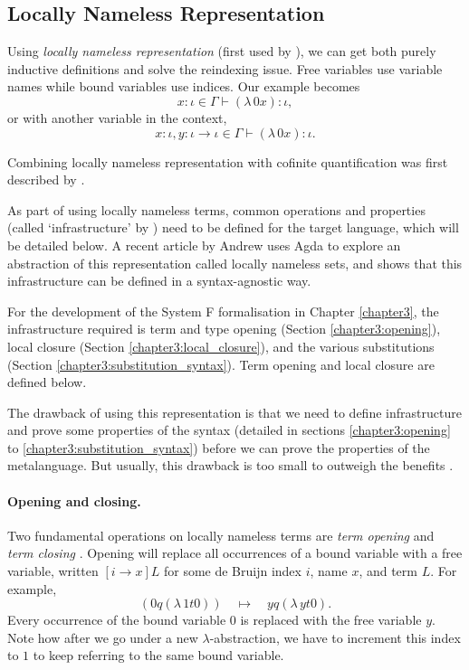 \subsection{Locally Nameless Representation}
\label{section:background_locally_nameless}
Using \textit{locally nameless representation} (first used by \citet{goos_mechanisation_1994}), we
can get both purely inductive definitions and solve the reindexing issue. Free variables use
variable names while bound variables use indices. Our example becomes
\begin{equation*}
  x \colon \iota \in \Gamma \vdash (\lambda \, 0 x) \colon \iota,
\end{equation*}
or with another variable in the context,
\begin{equation*}
  x \colon \iota, y \colon \iota \to \iota \in \Gamma \vdash (\lambda \, 0 x) \colon \iota.
\end{equation*}

Combining locally nameless representation with cofinite quantification was first described by
\citet{aydemir_engineering_2008}.

As part of using locally nameless terms, common operations and properties (called `infrastructure'
by \citet{aydemir_engineering_2008}) need to be defined for the target language, which will be
detailed below. A recent article by Andrew \citet{pitts_locally_2023} uses Agda to explore an
abstraction of this representation called locally nameless sets, and shows that this infrastructure
can be defined in a syntax-agnostic way.

For the development of the System F formalisation in Chapter \ref{chapter3}, the infrastructure
required is term and type opening (Section \ref{chapter3:opening}), local closure (Section
\ref{chapter3:local_closure}), and the various substitutions (Section
\ref{chapter3:substitution_syntax}). Term opening and local closure are defined below.

The drawback of using this representation is that we need to define infrastructure and prove some
properties of the syntax (detailed in sections \ref{chapter3:opening} to
\ref{chapter3:substitution_syntax}) before we can prove the properties of the metalanguage. But
usually, this drawback is too small to outweigh the benefits \citep{aydemir_engineering_2008}.

\paragraph*{Opening and closing.} Two fundamental operations on locally nameless terms are
\textit{term opening} and \textit{term closing} \citep{pitts_locally_2023}. Opening will replace all
occurrences of a bound variable with a free variable, written $[i \to x] L$ for some de Bruijn index
$i$, name $x$, and term $L$. For example,
\begin{equation*}
  [0 \to y] (0 q (\lambda \, 1 t 0)) \quad \mapsto \quad y q (\lambda \, y t 0).
\end{equation*}
Every occurrence of the bound variable $0$ is replaced with the free variable $y$. Note how after we
go under a new $\lambda$-abstraction, we have to increment this index to $1$ to keep referring to
the same bound variable.

